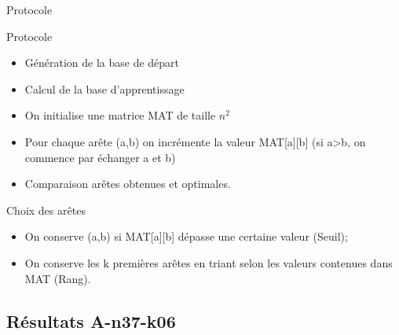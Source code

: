 \documentclass{beamer}
\begin{document}
\begin{frame}{Protocole}

\begin{exampleblock}{Protocole}
\begin{itemize}
\item Génération de la base de départ
\item Calcul de la base d'apprentissage
\item On initialise une matrice MAT de taille $n^2$
\item Pour chaque arête (a,b) on incrémente la valeur MAT[a][b] (si a>b, on commence par échanger a et b)
\item Comparaison arêtes obtenues et optimales.
\end{itemize}
\end{exampleblock}

\begin{block}{Choix des arêtes}
\begin{itemize}
\item On conserve (a,b) si MAT[a][b] dépasse une certaine valeur (Seuil);
\item On conserve les k premières arêtes en triant selon les valeurs contenues dans MAT (Rang).
\end{itemize}
\end{block}

\end{frame}

\subsection{Résultats A-n37-k06}
\end{document}

